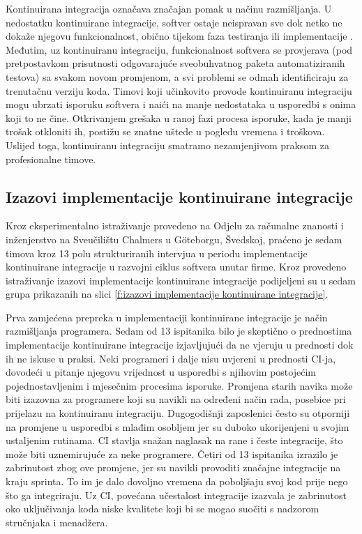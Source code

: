 \documentclass[a4paper,12pt,oneside]{article}
\begin{document}
Kontinuirana integracija označava značajan pomak u načinu razmišljanja. U nedostatku kontinuirane integracije, softver ostaje neispravan sve dok netko ne dokaže njegovu funkcionalnost, obično tijekom faza testiranja ili implementacije \cite{humble2010continuous}. Međutim, uz kontinuiranu integraciju, funkcionalnost softvera se provjerava (pod pretpostavkom prisutnosti odgovarajuće sveobuhvatnog paketa automatiziranih testova) sa svakom novom promjenom, a svi problemi se odmah identificiraju za trenutačnu verziju koda. Timovi koji učinkovito provode kontinuiranu integraciju mogu ubrzati isporuku softvera i naići na manje nedostataka u usporedbi s onima koji to ne čine. Otkrivanjem grešaka u ranoj fazi procesa isporuke, kada je manji trošak otkloniti ih, postižu se znatne uštede u pogledu vremena i troškova. Uslijed toga, kontinuiranu integraciju smatramo nezamjenjivom praksom za profesionalne timove.


\subsection{Izazovi implementacije kontinuirane integracije}
Kroz eksperimentalno istraživanje \cite{challenges} provedeno na Odjelu za računalne znanosti i inženjerstvo na Sveučilištu Chalmers u Göteborgu, Švedskoj, praćeno je sedam timova kroz 13 polu strukturiranih intervjua u periodu implementacije kontinuirane integracije u razvojni ciklus softvera unutar firme. Kroz provedeno istraživanje izazovi implementacije kontinuirane integracije podijeljeni su u sedam grupa prikazanih na slici \ref{f:izazovi implementacije kontinuirane integracije}.

Prva zamjećena prepreka u implementaciji kontinuirane integracije je način razmišljanja programera. Sedam od 13 ispitanika bilo je skeptično o prednostima implementacije kontinuirane integracije izjavljujući da ne vjeruju u prednosti dok ih ne iskuse u praksi. Neki programeri i dalje nisu uvjereni u prednosti CI-ja, dovodeći u pitanje njegovu vrijednost u usporedbi s njihovim postojećim pojednostavljenim i mjesečnim procesima isporuke. Promjena starih navika može biti izazovna za programere koji su navikli na određeni način rada, posebice pri prijelazu na kontinuiranu integraciju. Dugogodišnji zaposlenici često su otporniji na promjene u usporedbi s mlađim osobljem jer su duboko ukorijenjeni u svojim ustaljenim rutinama. CI stavlja snažan naglasak na rane i česte integracije, što može biti uznemirujuće za neke programere. Četiri od 13 ispitanika izrazilo je zabrinutost zbog ove promjene, jer su navikli provoditi značajne integracije na kraju sprinta. To im je dalo dovoljno vremena da poboljšaju svoj kod prije nego što ga integriraju. Uz CI, povećana učestalost integracije izazvala je zabrinutost oko uključivanja koda niske kvalitete koji bi se mogao suočiti s nadzorom stručnjaka i menadžera.
\end{document}
